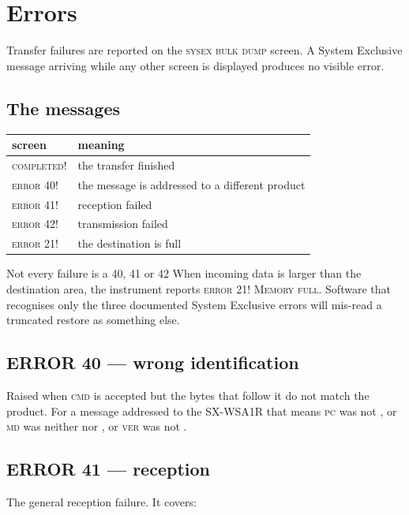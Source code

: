 \chapter{Errors}\label{ch:errors}

Transfer failures are reported on the \textsc{sysex bulk dump} screen. A System Exclusive
message arriving while any other screen is displayed produces no visible error.

\section{The messages}
\begin{center}
\begin{tabular}{ll}
\toprule
screen & meaning \\
\midrule
\textsc{completed!} & the transfer finished \\
\textsc{error 40!} & the message is addressed to a different product \\
\textsc{error 41!} & reception failed \\
\textsc{error 42!} & transmission failed \\
\textsc{error 21!} & the destination is full \\
\bottomrule
\end{tabular}
\end{center}

\begin{caution}{Not every failure is a 40, 41 or 42}
When incoming data is larger than the destination area, the instrument reports
\textsc{error 21! Memory full}. Software that recognises only the three documented
System Exclusive errors will mis-read a truncated restore as something else.
\end{caution}

\section{ERROR 40 --- wrong identification}
Raised when \textsc{cmd} is accepted but the bytes that follow it do not match the
product. For a message addressed to the SX-WSA1R that means \textsc{pc} was not
, or \textsc{md} was neither  nor , or \textsc{ver} was
not .

\section{ERROR 41 --- reception}
The general reception failure. It covers:

